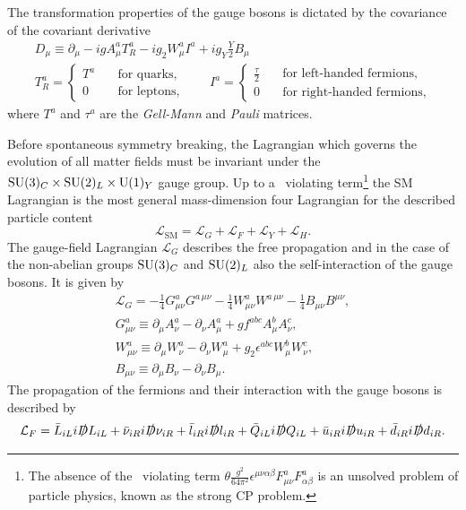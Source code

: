 The transformation properties of the gauge bosons is dictated by the covariance of the covariant derivative
\begin{equation}
\begin{gathered}
D_\mu \equiv \partial_\mu - i g A^a_\mu T_R^a - i g_2 W_\mu^a I^a + i g_Y \frac{Y}{2} B_\mu \\
T_R^a = \begin{cases} T^a \quad &\text{for quarks}, \\
  0 \quad &\text{for leptons},
\end{cases}
\qquad I^a = \begin{cases} \frac{\tau}{2} \quad &\text{for left-handed fermions}, \\
  0 \quad &\text{for right-handed fermions},
\end{cases}
\end{gathered}
\end{equation}
where $T^a$ and $\tau^a$ are the \textit{Gell-Mann} and \textit{Pauli} matrices.

Before spontaneous symmetry breaking, the Lagrangian which governs the evolution of all matter fields must be invariant under the $\mathrm{SU}(3)_C \times \mathrm{SU}(2)_L \times \mathrm{U}(1)_Y$ gauge group. Up to a \Charge\Parity\ violating term\footnote{The absence of the \Charge\Parity\ violating term $\theta \frac{g^2}{64 \pi^2}\epsilon^{\mu \nu \alpha \beta} F^{a}_{\mu \nu} F^{a}_{\alpha \beta}$ is an unsolved problem of particle physics, known as the strong CP problem.} the SM Lagrangian is the most general mass-dimension four Lagrangian for the described particle content
\begin{equation}
\mathcal{L}_\mathrm{SM} = \mathcal{L}_G + \mathcal{L}_F + \mathcal{L}_Y + \mathcal{L}_H.
\end{equation}
The gauge-field Lagrangian $\mathcal{L}_G$ describes the free propagation and in the case of the non-abelian groups $\mathrm{SU}(3)_C$ and $\mathrm{SU}(2)_L$ also the self-interaction of the gauge bosons. It is given by
\begin{equation}
\begin{gathered}
\mathcal{L}_G = - \frac{1}{4} G^{a}_{\mu \nu} G^{a\, \mu\nu} - \frac{1}{4} W^a_{\mu \nu} W^{a\, \mu\nu} - \frac{1}{4} B_{\mu\nu} B^{\mu \nu}, \\
G^a_{\mu\nu} \equiv \partial_\mu A^a_\nu - \partial_\nu A^a_\mu + g f^{abc} A^b_\mu A^c_\nu, \\
W^a_{\mu\nu} \equiv \partial_\mu W^a_\nu - \partial_\nu W^a_\mu + g_2 \epsilon^{abc} W^b_\mu W^c_\nu, \\
B_{\mu\nu} \equiv \partial_\mu B_\nu - \partial_\nu B_\mu.
\end{gathered}
\end{equation}
The propagation of the fermions and their interaction with the gauge bosons is described by
\begin{equation}
\mathcal{L}_F = \bar{L}_{iL} i \slashed{D} L_{iL} + \bar{\nu}_{iR} i \slashed{D} \nu_{iR} + \bar{l}_{iR} i \slashed{D} l_{iR} + \bar{Q}_{iL} i \slashed{D} Q_{iL} + \bar{u}_{iR} i \slashed{D} u_{iR} + \bar{d}_{iR} i \slashed{D} d_{iR}.
\end{equation}

